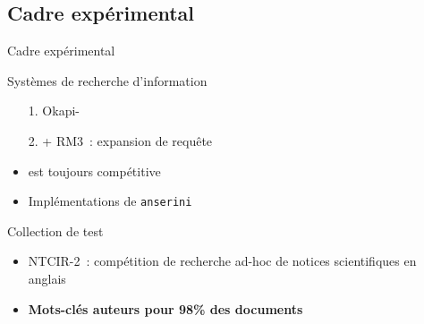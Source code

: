 \subsection{Cadre expérimental}

\begin{frame}{Cadre expérimental}
    \begin{block}{Systèmes de recherche d'information}
    \begin{itemize}
        \item[1.] Okapi-\bm{}~\cite{robertson_okapi_1999}
        \item[2.] + RM3~\cite{abdul-jaleel_umass_2004}: expansion de requête
        \item \bm{} est toujours compétitive~\cite{thakur_beir_2021}
        \item Implémentations de \texttt{anserini}~\cite{yang_anserini_2017}
    \end{itemize}
    \end{block}
    \begin{block}{Collection de test}
    \begin{itemize}
        \item NTCIR-2~\cite{kando_overview_2001}: compétition de recherche ad-hoc de notices scientifiques en anglais
         \item \textbf{Mots-clés auteurs pour 98\% des documents}
    \end{itemize}
    \end{block}
    \vspace{-.5cm}
    
\end{frame}

